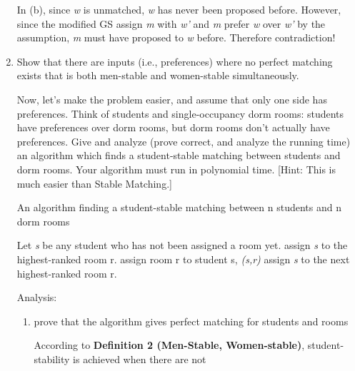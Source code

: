 \documentclass{homework}
\begin{document}
\begin{enumerate}
    In (b), since \textit{w} is unmatched, \textit{w} has never been proposed before. However, since the modified GS assign \textit{m} with \textit{w'} and \textit{m} prefer \textit{w} over \textit{w'} by the assumption, \textit{m} must have proposed to \textit{w} before. Therefore contradiction!

    \item 
    \question[1] Show that there are inputs (i.e., preferences) where no perfect matching exists that is both men-stable and women-stable simultaneously.

    \question[2] Now, let’s make the problem easier, and assume that only one side has preferences. Think of students and single-occupancy dorm rooms: students have preferences over dorm rooms, but dorm rooms don’t actually have preferences. Give and analyze (prove correct, and analyze the running time) an algorithm which finds a student-stable matching between students and dorm rooms. Your algorithm must run in polynomial time.
    [Hint: This is much easier than Stable Matching.]

 
    \begin{algorithm}
    \caption{An algorithm finding a student-stable matching between n students and n dorm rooms}\label{alg:cap}
    \begin{algorithmic}
        Let \textit{s} be any student who has not been assigned a room yet.
        assign \textit{s} to the highest-ranked room r.
                    \State assign room r to student s, \textit{(s,r)}
                \Else
                    \State assign \textit{s} to the next highest-ranked room r.
                \EndIf
        \EndWhile
    \EndWhile
    \end{algorithmic}
    \end{algorithm}

    Analysis:
    \begin{enumerate}
        \item prove that the algorithm gives perfect matching for students and rooms

        According to \textbf{Definition 2 (Men-Stable, Women-stable)}, student-stability is achieved when there are not 
    \end{enumerate}
\end{enumerate}
\end{document}
